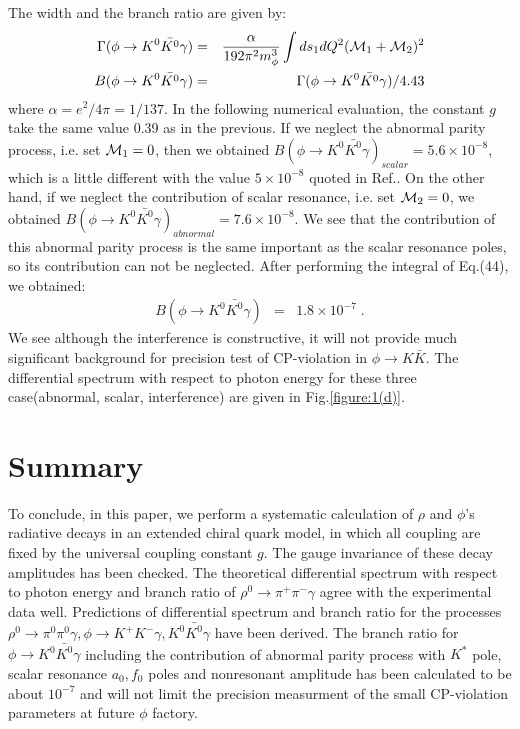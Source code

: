 The width and the branch ratio are given by: 
\begin{eqnarray}
\Gamma(\phi \rightarrow K^0 \bar{K^0} \gamma)&=&\frac{\alpha}{192\pi^2
m_\phi^3} \int ds_1 dQ^2 ({\cal M}_1+{\cal M}_2)^2 \\
B(\phi \rightarrow K^0 \bar{K^0} \gamma)&=&\Gamma(\phi \rightarrow K^0
\bar{K^0} \gamma)/4.43
\end{eqnarray}
where $\alpha=e^2/4\pi=1/137$. In the following numerical evaluation,
the constant $g$ take the same value 0.39 as in the previous. If we
neglect the abnormal parity
process, i.e. set ${\cal M}_1=0$, then we obtained $B(\phi \rightarrow 
K^0 \bar{K^0} \gamma)_{scalar}=5.6\times 10^{-8}$, which is a little
different with the value $5\times 10^{-8}$ 
quoted in Ref.\cite{b6}. On the other hand, if we neglect the contribution
of scalar  resonance, i.e. set ${\cal M}_2=0$, we obtained $B(\phi
\rightarrow K^0 \bar{K^0} \gamma)_{abnormal}=7.6\times 10^{-8}$. We see
that the contribution of this abnormal parity process is the same
important as the
scalar resonance poles, so its contribution can not be neglected.
After performing the integral of Eq.(44), we obtained:
\begin{eqnarray}
B(\phi \rightarrow
K^0\bar{K^0}\gamma)&=&1.8\times10^{-7}{\;}.
\end{eqnarray} 
We see although the interference is constructive, it will not provide much
significant background for precision test of CP-violation in $\phi
\rightarrow K \bar K$. The differential spectrum with respect to photon
energy for these three case(abnormal, scalar, interference) are given in 
Fig.\ref{figure:1(d)}.       


\section{Summary}
To conclude, in this paper, we perform a systematic calculation of 
$\rho$ and $\phi$'s radiative decays in an extended chiral quark model,
 in which all coupling are fixed by the universal coupling constant 
$g$. The gauge invariance of these decay amplitudes has been checked. The
theoretical differential spectrum with respect to photon energy and
branch ratio of $\rho^0 \rightarrow \pi^+\pi^- \gamma$ agree
with the experimental data well. Predictions of differential spectrum
and branch ratio for the processes
$\rho^0 \rightarrow \pi^0\pi^0 \gamma, \phi \rightarrow K^+ K^- \gamma,
K^0 \bar {K^0} \gamma$ have been derived. The branch ratio for $\phi
\rightarrow K^0 \bar{K^0} \gamma$ including the contribution of abnormal
parity process with $K^*$ pole, scalar resonance $a_0, f_0$ poles and
nonresonant amplitude has been calculated to be about $10^{-7}$ and will
not limit the precision measurment of the small CP-violation parameters at
future $\phi$ factory.


